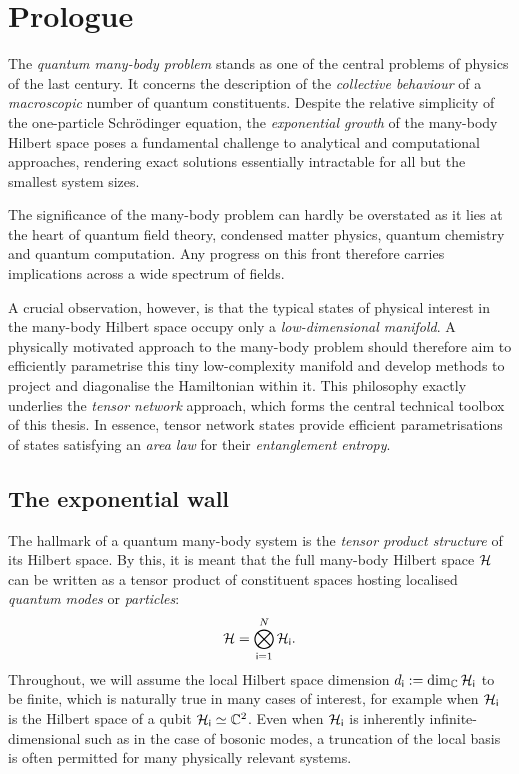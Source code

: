 \chapter{Prologue}\label{chap:introduction}
The \emph{quantum many-body problem} stands as one of the central problems of physics of the last century. It concerns the description of the \emph{collective behaviour} of a \emph{macroscopic} number of quantum constituents. Despite the relative simplicity of the one-particle Schr\"odinger equation, the \emph{exponential growth} of the many-body Hilbert space poses a fundamental challenge to analytical and computational approaches, rendering exact solutions essentially intractable for all but the smallest system sizes.

The significance of the many-body problem can hardly be overstated as it lies at the heart of quantum field theory, condensed matter physics, quantum chemistry and quantum computation. Any progress on this front therefore carries implications across a wide spectrum of fields.

A crucial observation, however, is that the typical states of physical interest in the many-body Hilbert space occupy only a \emph{low-dimensional manifold}. A physically motivated approach to the many-body problem should therefore aim to efficiently parametrise this tiny low-complexity manifold and develop methods to project and diagonalise the Hamiltonian within it. This philosophy exactly underlies the \emph{tensor network} approach, which forms the central technical toolbox of this thesis. In essence, tensor network states provide efficient parametrisations of states satisfying an \emph{area law} for their \emph{entanglement entropy}.
\section{The exponential wall}
The hallmark of a quantum many-body system is the \emph{tensor product structure} of its Hilbert space. By this, it is meant that the full many-body Hilbert space $\mathcal{H}$ can be written as a tensor product of constituent spaces hosting localised \emph{quantum modes} or \emph{particles}:
\begin{equation}\label{eq:HilbertSpace}
	\mathcal{H} = \bigotimes_{\mathsf{i}=1}^N \mathcal{H}_{\mathsf{i}}.
\end{equation}
Throughout, we will assume the local Hilbert space dimension $d_{\mathsf{i}}:=\dim_\mathbb C\mathcal{H}_{\mathsf{i}}$ to be finite, which is naturally true in many cases of interest, for example when $\mathcal{H}_{\mathsf{i}}$ is the Hilbert space of a qubit $\mathcal{H}_{\mathsf{i}}\simeq\mathbb C^2$. Even when $\mathcal{H}_{\mathsf{i}}$ is inherently infinite-dimensional such as in the case of bosonic modes, a truncation of the local basis is often permitted for many physically relevant systems.

